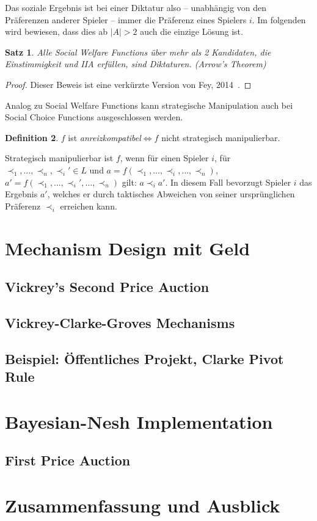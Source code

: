 \documentclass[a4paper,11pt]{article}
\theoremstyle{definition}
\newtheorem{definition}{Definition}
\theoremstyle{plain}
\newtheorem{theorem}[definition]{Satz}
\theoremstyle{definition}
\begin{document}
Das soziale Ergebnis ist bei einer Diktatur also -- unabhängig von den Präferenzen anderer Spieler -- immer die Präferenz eines Spielers $i$.
Im folgenden wird bewiesen, dass dies ab $|A| > 2$ auch die einzige Lösung ist.

\begin{theorem}
	Alle Social Welfare Functions über mehr als 2 Kandidaten, die Einstimmigkeit und IIA erfüllen, sind Diktaturen. (Arrow's Theorem)
\end{theorem}

\begin{proof}
	Dieser Beweis ist eine verkürzte Version von Fey, 2014~\cite{fey14}.
	
	
\end{proof}

Analog zu Social Welfare Functions kann strategische Manipulation auch bei Social Choice Functions ausgeschlossen werden.
\begin{definition}
	\label{def:anreizkompatibel}
	$f$ ist \emph{anreizkompatibel}$\iff$$f$ nicht strategisch manipulierbar.
\end{definition}
Strategisch manipulierbar ist $f$, wenn für einen Spieler $i$, für $\prec_1, \ldots, \prec_n, \prec_i' \in L$ und $a = f(\prec_1, \ldots, \prec_i, \ldots, \prec_n)$, $a' = f(\prec_1, \ldots, \prec_i', \ldots, \prec_n)$ gilt: $a \prec_i a'$. In diesem Fall bevorzugt Spieler $i$ das Ergebnis $a'$, welches er durch taktisches Abweichen von seiner ursprünglichen Präferenz $\prec_i$ erreichen kann.

\section{Mechanism Design mit Geld}
\subsection{Vickrey's Second Price Auction}
\subsection{Vickrey-Clarke-Groves Mechanisms}
\subsection{Beispiel: Öffentliches Projekt, Clarke Pivot Rule}

\section{Bayesian-Nesh Implementation}
\subsection{First Price Auction}

\section{Zusammenfassung und Ausblick}
~\cite{lov21}



\end{document}

